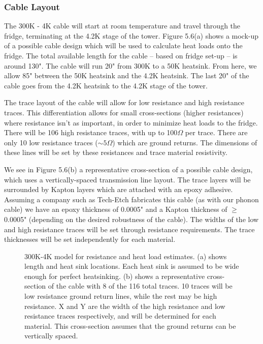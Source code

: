 \documentclass{report}
\begin{document}

\subsubsection{Cable Layout}

The 300K - 4K cable will start at room temperature and travel through the fridge, terminating at the 4.2K stage of the tower. Figure 5.6(a) shows a mock-up of a possible cable design which will be used to calculate heat loads onto the fridge. The total available length for the cable -- based on fridge set-up -- is around 130". The cable will run 20" from 300K to a 50K heatsink. From here, we allow 85" between the 50K heatsink and the 4.2K heatsink. The last 20" of the cable goes from the 4.2K heatsink to the 4.2K stage of the tower.

The trace layout of the cable will allow for low resistance and high resistance traces. This differentiation allows for small cross-sections (higher resistances) where resistance isn't as important, in order to minimize heat loads to the fridge. There will be 106 high resistance traces, with up to 100$\Omega$ per trace. There are only 10 low resistance traces ($\sim 5 \Omega$) which are ground returns. The dimensions of these lines will be set by these resistances and trace material resistivity.

We see in Figure 5.6(b) a representative cross-section of a possible cable design, which uses a vertically-spaced transmission line layout. The trace layers will be surrounded by Kapton layers which are attached with an epoxy adhesive. Assuming a company such as Tech-Etch fabricates this cable (as with our phonon cable) we have an epoxy thickness of 0.0005" and a Kapton thickness of $\geq$0.0005" (depending on the desired robustness of the cable). The widths of the low and high resistance traces will be set through resistance requirements. The trace thicknesses will be set independently for each material.

\begin{figure}[ht]
\centering
{}
\caption{300K-4K model for resistance and heat load estimates. (a) shows length and heat sink locations. Each heat sink is assumed to be wide enough for perfect heatsinking. (b) shows a representative cross-section of the cable with 8 of the 116 total traces. 10 traces will be low resistance ground return lines, while the rest may be high resistance. X and Y are the width of the high resistance and low resistance traces respectively, and will be determined for each material. This cross-section assumes that the ground returns can be vertically spaced.}
\end{figure}
\end{document}
